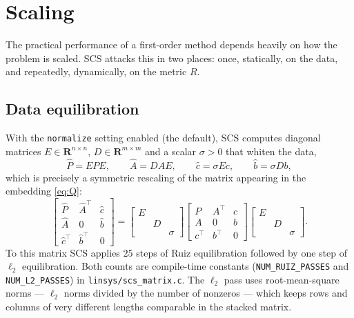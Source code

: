 \documentclass[11pt,a4paper]{article}
\newcommand{\R}{\mathbf{R}}
\newcommand{\tr}{^\top}
\theoremstyle{plain}
\begin{document}
\section{Scaling}\label{sec:scaling}

The practical performance of a first-order method depends heavily on how the
problem is scaled. SCS attacks this in two places: once, statically, on the
data, and repeatedly, dynamically, on the metric $R$.

\subsection{Data equilibration}

With the \texttt{normalize} setting enabled (the default), SCS computes
diagonal matrices $E \in \R^{n \times n}$, $D \in \R^{m \times m}$ and a scalar
$\sigma > 0$ that whiten the data,
\begin{equation}\label{eq:equil}
\hat P = EPE, \qquad \hat A = DAE, \qquad \hat c = \sigma E c, \qquad
\hat b = \sigma D b,
\end{equation}
which is precisely a symmetric rescaling of the matrix appearing in the
embedding \eqref{eq:Q}:
\begin{equation}
\begin{bmatrix} \hat P & \hat A\tr & \hat c \\
                \hat A & 0 & \hat b \\
                \hat c\tr & \hat b\tr & 0 \end{bmatrix}
=
\begin{bmatrix} E & & \\ & D & \\ & & \sigma \end{bmatrix}
\begin{bmatrix} P & A\tr & c \\ A & 0 & b \\ c\tr & b\tr & 0 \end{bmatrix}
\begin{bmatrix} E & & \\ & D & \\ & & \sigma \end{bmatrix} .
\end{equation}
To this matrix SCS applies $25$ steps of Ruiz equilibration
\cite{ruiz:01} followed by one step of $\ell_2$ equilibration. Both counts are
compile-time constants (\texttt{NUM\_RUIZ\_PASSES} and
\texttt{NUM\_L2\_PASSES}) in \texttt{linsys/scs\_matrix.c}. The $\ell_2$ pass
uses
root-mean-square norms --- $\ell_2$ norms divided by the number of nonzeros ---
which keeps rows and columns of very different lengths comparable in the
stacked matrix.
\end{document}
